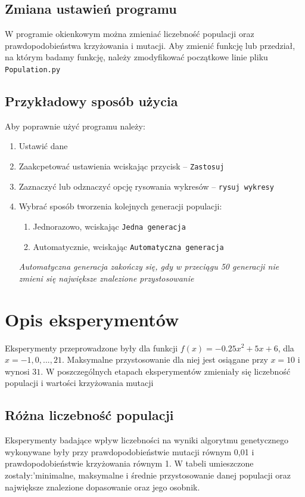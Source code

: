 \documentclass[a4paper,11pt]{article}
\begin{document}
		\subsection{Zmiana ustawień programu}
			W programie okienkowym można zmieniać liczebność populacji oraz prawdopodobieństwa krzyżowania i mutacji.
			Aby zmienić funkcję lub przedział, na którym badamy funkcję, należy zmodyfikować początkowe linie pliku \texttt{Population.py}
	
		\subsection{Przykładowy sposób użycia}
		Aby poprawnie użyć programu należy:
		\begin{enumerate}
		\item Ustawić dane
		\item Zaakcpetować ustawienia wciskając przycisk -- \texttt{Zastosuj}
		\item Zaznaczyć lub odznaczyć opcję rysowania wykresów -- \texttt{rysuj wykresy}
		\item Wybrać sposób tworzenia kolejnych generacji populacji:
			\begin{enumerate}
				\item Jednorazowo, wciskając \texttt{Jedna generacja}
				\item Automatycznie, wciskając \texttt{Automatyczna generacja}
			\end{enumerate}
			\textit{Automatyczna generacja zakończy się, gdy w przeciągu 50 generacji nie zmieni się największe znalezione przystosowanie}
		\end{enumerate}
		
	\section{Opis eksperymentów}
	Eksperymenty przeprowadzone były dla funkcji $f(x) = -0.25x^2 + 5x + 6$, dla $x = -1, 0, ..., 21$. Maksymalne przystosowanie dla niej jest osiągane przy $x = 10$ i wynosi $31$. W poszczególnych etapach eksperymentów zmieniały się liczebność populacji i wartości krzyżowania mutacji
	
		\subsection{Różna liczebność populacji}
			Eksperymenty badające wpływ liczebności na wyniki algorytmu genetycznego wykonywane były przy prawdopodobieństwie mutacji równym 0,01 i prawdopodobieństwie krzyżowania równym 1. W tabeli umieszczone zostały:'minimalne, maksymalne i średnie przystosowanie danej populacji oraz największe znalezione dopasowanie oraz jego osobnik.
\end{document}

